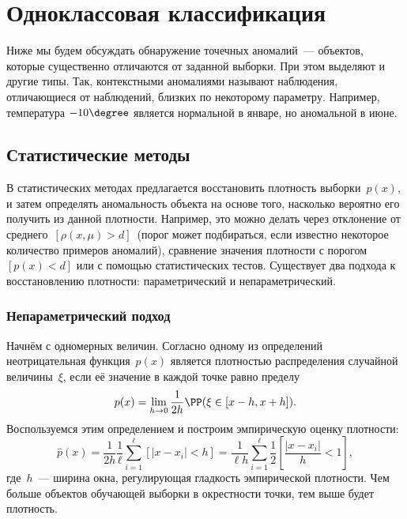 \documentclass[12pt,fleqn]{article}
\begin{document}
\section{Одноклассовая классификация}

Ниже мы будем обсуждать обнаружение точечных аномалий~--- объектов,
которые существенно отличаются от заданной выборки.
При этом выделяют и другие типы.
Так, контекстными аномалиями называют наблюдения, отличающиеся
от наблюдений, близких по некоторому параметру.
Например, температура $-10\degree$ является нормальной в январе,
но аномальной в июне.

\subsection{Статистические методы}

В статистических методах предлагается восстановить плотность выборки~$p(x)$,
и затем определять аномальность объекта на основе того,
насколько вероятно его получить из данной плотности.
Например, это можно делать через отклонение от среднего~$[\rho(x, \mu) > d]$~(порог
может подбираться, если известно некоторое количество примеров аномалий),
сравнение значения плотности с порогом~$[p(x) < d]$
или с помощью статистических тестов.
Существует два подхода к восстановлению плотности: параметрический
и непараметрический.

\subsubsection{Непараметрический подход}

Начнём с одномерных величин.
Согласно одному из определений неотрицательная функция~$p(x)$
является плотностью распределения случайной величины~$\xi$, если её значение в каждой точке
равно пределу
\[
    p(x)
    =
    \lim_{h \to 0}
        \frac{1}{2h}
        \PP(\xi \in [x - h, x + h]).
\]
Воспользуемся этим определением и построим эмпирическую оценку плотности:
\[
    \hat p(x)
    =
    \frac{1}{2h} \frac{1}{\ell}
    \sum_{i = 1}^{\ell}
        \left[
            |x - x_i| < h
        \right]
    =
    \frac{1}{\ell h}
    \sum_{i = 1}^{\ell}
        \frac12
        \left[
            \frac{|x - x_i|}{h} < 1
        \right],
\]
где~$h$~--- ширина окна, регулирующая гладкость эмпирической плотности.
Чем больше объектов обучающей выборки в окрестности точки, тем выше будет плотность.
\end{document}
